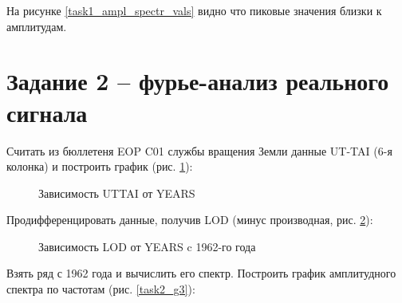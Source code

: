 \documentclass[a4paper,oneside,14pt]{extreport}
\begin{document}
На рисунке \ref{task1_ampl_spectr_vals} видно что пиковые значения близки к амплитудам.

\section*{Задание 2 – фурье-анализ реального сигнала}
Считать из бюллетеня EOP C01 службы вращения Земли данные UT-TAI (6-я колонка) и построить график (рис. \ref{task2_g1}):

\begin{figure}[h]
	\caption{Зависимость UTTAI от YEARS}
	\label{task2_g1}
\end{figure}

\newpage
Продифференцировать данные, получив LOD (минус производная, рис. \ref{task2_g2}):

\begin{figure}[h]
	\caption{Зависимость LOD от YEARS c 1962-го года}
	\label{task2_g2}
\end{figure}

Взять ряд с 1962 года  и вычислить его спектр. Построить график амплитудного спектра по частотам (рис. \ref{task2_g3}):
\end{document}
